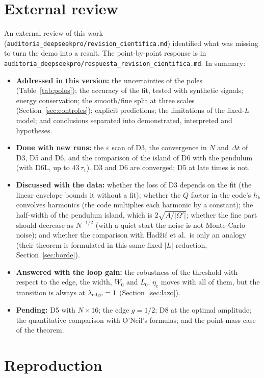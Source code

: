 \documentclass[11pt,a4paper]{article}
\begin{document}
\section{External review}
\label{sec:revision}

An external review of this work (\texttt{auditoria\_deepseekpro/revision\_cientifica.md})
identified what was missing to turn the demo into a result. The point-by-point response is
in \texttt{auditoria\_deepseekpro/respuesta\_revision\_cientifica.md}. In summary:
\begin{itemize}
\item \textbf{Addressed in this version:} the uncertainties of the poles
(Table~\ref{tab:polos}); the accuracy of the fit, tested with synthetic signals; energy
conservation; the smooth/fine split at three scales (Section~\ref{sec:controles}); explicit
predictions; the limitations of the fixed-$L$ model; and conclusions separated into
demonstrated, interpreted and hypotheses.
\item \textbf{Done with new runs:} the $\varepsilon$ scan of D3, the convergence in $N$ and
$\Delta t$ of D3, D5 and D6, and the comparison of the island of D6 with the pendulum (with
D6L, up to $43\,\tau_1$). D3 and D6 are converged; D5 at late times is not.
\item \textbf{Discussed with the data:} whether the loss of D3 depends on the fit (the
linear envelope bounds it without a fit); whether the $Q$ factor in the code's $h_k$
convolves harmonics (the code multiplies each harmonic by a constant); the half-width of
the pendulum island, which is $2\sqrt{A/|\Omega'|}$; whether the fine part should decrease as
$N^{-1/2}$ (with a quiet start the noise is not Monte Carlo noise); and whether the
comparison with Hadžić et al.\ is only an analogy (their theorem is formulated in this same
fixed-$|L|$ reduction, Section~\ref{sec:borde}).
\item \textbf{Answered with the loop gain:} the robustness of the threshold with respect to
the edge, the width, $W_0$ and $L_0$. $\eta_c$ moves with all of them, but the transition is
always at $\lambda_{\rm edge}=1$ (Section~\ref{sec:lazo}).
\item \textbf{Pending:} D5 with $N\times16$; the edge $g=1/2$; D8 at the optimal amplitude;
the quantitative comparison with O'Neil's formulas; and the point-mass case of the
theorem.
\end{itemize}

\section{Reproduction}
\label{sec:reproducir}
\end{document}
